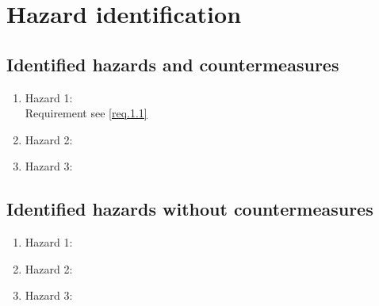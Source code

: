 \section{Hazard identification}
\label{chapter4}

\subsection{Identified hazards and countermeasures}


	\begin{enumerate}
		\item Hazard 1: \\
			Requirement see \ref{req.1.1} \\
		\item Hazard 2:
		\item Hazard 3:
	\end{enumerate}
	
\subsection{Identified hazards without countermeasures }

	\begin{enumerate}
		\item Hazard 1: \\
		\item Hazard 2:
		\item Hazard 3:
	\end{enumerate}